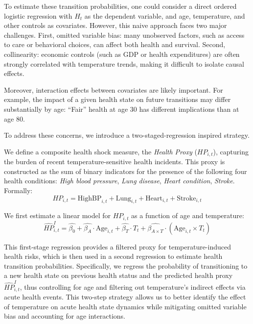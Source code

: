\documentclass{article}
\begin{document}
To estimate these transition probabilities, one could consider a direct ordered logistic regression with $H_t$ as the dependent variable, and age, temperature, and other controls as covariates. However, this naive approach faces two major challenges. First, omitted variable bias: many unobserved factors, such as access to care or behavioral choices, can affect both health and survival. Second, collinearity: economic controls (such as GDP or health expenditures) are often strongly correlated with temperature trends, making it difficult to isolate causal effects.

Moreover, interaction effects between covariates are likely important.
For example, the impact of a given health state on future transitions may differ substantially by age: 
“Fair” health at age 30 has different implications than at age 80.

To address these concerns, we introduce a two-staged-regression inspired strategy.

We define a composite health shock measure, the \textit{Health Proxy} ($HP_{i,t}$), capturing the burden of recent temperature-sensitive health incidents.
This proxy is constructed as the sum of binary indicators for the presence of the following four health conditions:
\textit{High blood pressure},
\textit{Lung disease},
\textit{Heart condition},
\textit{Stroke}.
Formally:
\[
HP_{i,t} = \text{HighBP}_{i,t} + \text{Lung}_{i,t} + \text{Heart}_{i,t} + \text{Stroke}_{i,t}
\]

We first estimate a linear model for $HP_{i,t}$ as a function of age and temperature:
\[
\widehat{HP}_{i,t}^{I} = \widehat{\beta_0} + \widehat{\beta_A} \cdot \text{Age}_{i,t} + \widehat{\beta_T} \cdot T_t + \widehat{\beta_{A \times T}} \cdot (\text{Age}_{i,t} \times T_t)
\]

This first-stage regression provides a filtered proxy for temperature-induced health risks, which is then used in a second regression to estimate health transition probabilities. Specifically, we regress the probability of transitioning to a new health state on previous health status and the predicted health proxy $\widehat{HP}_{i,t}^{I}$, thus controlling for age and filtering out temperature's indirect effects via acute health events.
This two-step strategy allows us to better identify the effect of 
temperature on acute health state dynamics 
while mitigating omitted variable bias and accounting for age interactions.
\\
\end{document}
